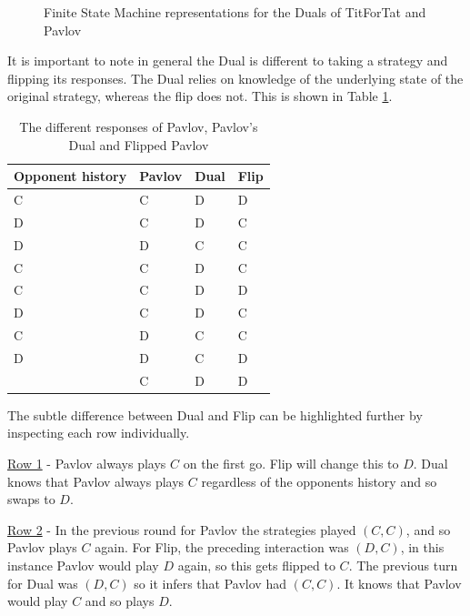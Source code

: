 \begin{figure}[hbtp!]
\centering
{}
\caption{Finite State Machine representations for the Duals of TitForTat and Pavlov}
\end{figure}

It is important to note in general the Dual is different to taking a strategy and flipping its responses.
The Dual relies on knowledge of the underlying state of the original strategy, whereas the flip does not.
This is shown in Table \ref{tab:strat-dual-flip}.

\begin{table}[htbp]
    \centering
    \begin{tabular}{l l l l}
        \toprule
        Opponent history & Pavlov & Dual & Flip \\
        \midrule
        C & C & D & D \\
        D & C & D & C \\
        D & D & C & C \\
        C & C & D & C \\
        C & C & D & D \\
        D & C & D & C \\
        C & D & C & C \\
        D & D & C & D \\
          & C & D & D \\
        \bottomrule
    \end{tabular}
    \caption{The different responses of Pavlov, Pavlov's Dual and Flipped Pavlov}
    \label{tab:strat-dual-flip}
\end{table}

The subtle difference between Dual and Flip can be highlighted further by inspecting each row individually.

\underline{Row 1} - Pavlov always plays $C$ on the first go.
Flip will change this to $D$.
Dual knows that Pavlov always plays $C$ regardless of the opponents history and so swaps to $D$.

\underline{Row 2} - In the previous round for Pavlov the strategies played $(C, C)$, and so Pavlov plays $C$ again.
For Flip, the preceding interaction was $(D, C)$, in this instance Pavlov would play $D$ again, so this gets flipped to $C$.
The previous turn for Dual was $(D, C)$ so it infers that Pavlov had $(C, C)$.
It knows that Pavlov would play $C$ and so plays $D$.

